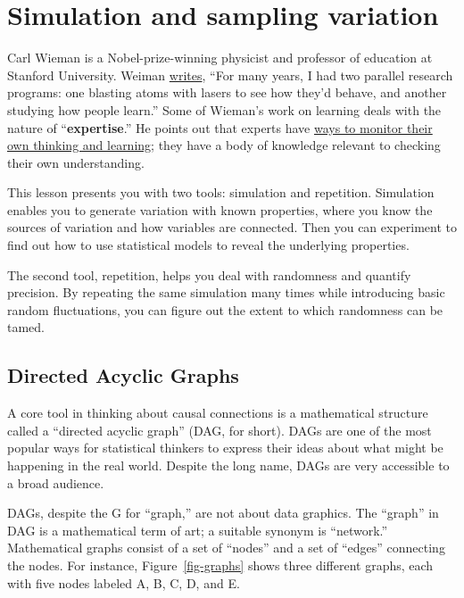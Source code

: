 \documentclass[
  letterpaper,
  DIV=11,
  numbers=noendperiod,
  oneside]{scrreprt}
\begin{document}
\hypertarget{sec-lesson-20}{%
\chapter{Simulation and sampling variation}\label{sec-lesson-20}}

Carl Wieman is a Nobel-prize-winning physicist and professor of
education at Stanford University. Weiman
\href{https://ed.stanford.edu/about/community/carl-wieman}{writes},
``For many years, I had two parallel research programs: one blasting
atoms with lasers to see how they'd behave, and another studying how
people learn.'' Some of Wieman's work on learning deals with the nature
of ``\textbf{expertise}.'' He points out that experts have
\href{https://www.youtube.com/watch?v=12oJzN5I4H8}{ways to monitor their
own thinking and learning}; they have a body of knowledge relevant to
checking their own understanding.

This lesson presents you with two tools: simulation and repetition.
Simulation enables you to generate variation with known properties,
where you know the sources of variation and how variables are connected.
Then you can experiment to find out how to use statistical models to
reveal the underlying properties.

The second tool, repetition, helps you deal with randomness and quantify
precision. By repeating the same simulation many times while introducing
basic random fluctuations, you can figure out the extent to which
randomness can be tamed.

\hypertarget{directed-acyclic-graphs}{%
\section{Directed Acyclic Graphs}\label{directed-acyclic-graphs}}

A core tool in thinking about causal connections is a mathematical
structure called a ``directed acyclic graph'' (DAG, for short). DAGs are
one of the most popular ways for statistical thinkers to express their
ideas about what might be happening in the real world. Despite the long
name, DAGs are very accessible to a broad audience.

DAGs, despite the G for ``graph,'' are not about data graphics. The
``graph'' in DAG is a mathematical term of art; a suitable synonym is
``network.'' Mathematical graphs consist of a set of ``nodes'' and a set
of ``edges'' connecting the nodes. For instance, Figure~\ref{fig-graphs}
shows three different graphs, each with five nodes labeled A, B, C, D,
and E.
\end{document}
